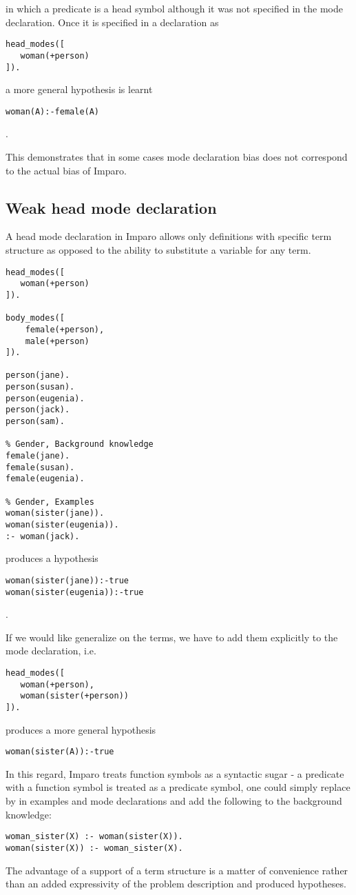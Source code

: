 in which a predicate  is a head symbol although it was not specified in the mode declaration. Once it is specified in a declaration as
\begin{lstlisting}    
head_modes([
   woman(+person)
]).
\end{lstlisting}

a more general hypothesis is learnt

\begin{lstlisting}
woman(A):-female(A)
\end{lstlisting}.

This demonstrates that in some cases mode declaration bias does not correspond to the actual bias of Imparo.

\subsection{Weak head mode declaration}
A head mode declaration in Imparo allows only definitions with specific term structure as opposed to the ability to substitute a variable for any term.

\begin{lstlisting}
head_modes([
   woman(+person)
]).

body_modes([
    female(+person),
    male(+person)
]).

person(jane).
person(susan).
person(eugenia).
person(jack).
person(sam).

% Gender, Background knowledge
female(jane).
female(susan).
female(eugenia).

% Gender, Examples
woman(sister(jane)).
woman(sister(eugenia)).
:- woman(jack).
\end{lstlisting}

produces a hypothesis 
\begin{lstlisting}
woman(sister(jane)):-true
woman(sister(eugenia)):-true
\end{lstlisting}.

If we would like generalize on the terms, we have to add them explicitly to the mode declaration, i.e.
\begin{lstlisting}
head_modes([
   woman(+person),
   woman(sister(+person))
]).
\end{lstlisting}
produces a more general hypothesis
\begin{lstlisting}
woman(sister(A)):-true
\end{lstlisting}

In this regard, Imparo treats function symbols as a syntactic sugar - a predicate with a function symbol is treated as a predicate symbol, one could simply replace  by  in examples and mode declarations and add the following to the background knowledge:
\begin{lstlisting}
woman_sister(X) :- woman(sister(X)).
woman(sister(X)) :- woman_sister(X).
\end{lstlisting}
The advantage of a support of a term structure is a matter of convenience rather than an added expressivity of the problem description and produced hypotheses.

